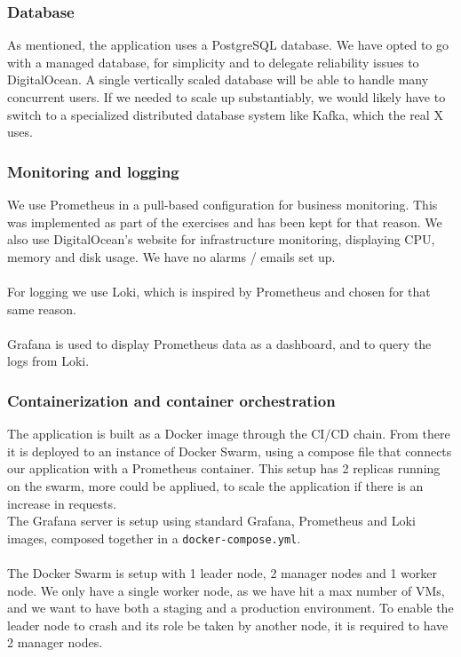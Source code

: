 \subsubsection{Database}
As mentioned, the application uses a PostgreSQL database. We have opted to go with a managed database, for simplicity and to delegate reliability issues to DigitalOcean. A single vertically scaled database will be able to handle many concurrent users. If we needed to scale up substantiably, we would likely have to switch to a specialized distributed database system like Kafka, which the real X uses\cite{kafka}.

\subsubsection*{Monitoring and logging}
We use Prometheus in a pull-based configuration for business monitoring. This was implemented as part of the exercises and has been kept for that reason. We also use DigitalOcean's website for infrastructure monitoring, displaying CPU, memory and disk usage. We have no alarms / emails set up.\\\\
For logging we use Loki, which is inspired by Prometheus and chosen for that same reason\cite{Loki}.\\\\
Grafana is used to display Prometheus data as a dashboard, and to query the logs from Loki.

\subsubsection{Containerization and container orchestration}
The application is built as a Docker image through the CI/CD chain. From there it is deployed to an instance of Docker Swarm, using a compose file that connects our application with a Prometheus container. This setup has 2 replicas running on the swarm, more could be appliued, to scale the application if there is an increase in requests.\\
The Grafana server is setup using standard Grafana, Prometheus and Loki images, composed together in a \texttt{docker-compose.yml}.\\\\
The Docker Swarm is setup with 1 leader node, 2 manager nodes and 1 worker node. We only have a single worker node, as we have hit a max number of VMs, and we want to have both a staging and a production environment. To enable the leader node to crash and its role be taken by another node, it is required to have 2 manager nodes.\\\\


